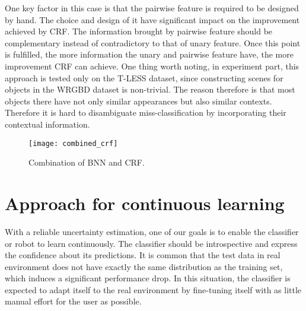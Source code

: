 One key factor in this case is that the pairwise feature is required to be designed by hand.
The choice and design of it have significant impact on the improvement achieved by \gls{CRF}.
The information brought by pairwise feature should be complementary instead of contradictory to that of unary feature.
Once this point is fulfilled, the more information the unary and pairwise feature have, the more improvement \gls{CRF} can achieve. %
One thing worth noting, in experiment part, this approach is tested only on the T-LESS dataset, since constructing scenes for objects in the \gls{WRGBD} dataset is non-trivial.
The reason therefore is that most objects there have not only similar appearances but also similar contexts.
Therefore it is hard to disambiguate miss-classification by incorporating their contextual information.
\begin{figure}[H]
	\begin{center}
		\texttt{[image: combined\_crf]}
		\caption{Combination of \gls{BNN} and \gls{CRF}.}		
		\label{fig:combined_crf}
	\end{center}
\end{figure}
\section{Approach for continuous learning}
With a reliable uncertainty estimation, one of our goals is to enable the classifier or robot to learn continuously.
The classifier should be introspective and express the confidence about its predictions.
It is common that the test data in real environment does not have exactly the same distribution as the training set, which induces a significant performance drop.
In this situation, the classifier is expected to adapt itself to the real environment by fine-tuning itself with as little manual effort for the user as possible. 

